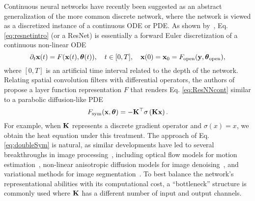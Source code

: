 \documentclass[reqno]{amsart}
\newcommand{\bfx}{ {\bf x}}
\newcommand{\bfy}{ {\bf y}}
\newcommand{\bfK}{{\bf K}}
\newcommand{\bftheta}{{\boldsymbol{\theta}}}
\begin{document}
Continuous neural networks have recently been suggested as an abstract generalization of the more common discrete network, where the network is viewed as a discretized instance of a continuous ODE or PDE. As shown by~\cite{ChaudhariEtAl2017,E2017,HaberRuthotto2017,chen2018neural}, Eq. \eqref{eq:resnetintro} (or a ResNet) is essentially a forward Euler discretization of a continuous non-linear ODE
\begin{equation}
\label{eq:ResNNcont}
    \partial_t \bfx(t) = F(\bfx(t), \bftheta(t)), \quad t \in [0,T], \quad \bfx(0) = \bfx_0 = F_{\mathrm{open}}(\bfy,\bftheta_{\mathrm{open}}),
\end{equation}
where  $[0,T]$ is an artificial time interval related to the depth of the network. Relating spatial convolution filters with differential operators, the authors of~\cite{ruthotto2019deep} propose a layer function representation $F$ that renders Eq. \eqref{eq:ResNNcont} similar to a parabolic diffusion-like PDE
\begin{equation}
\label{eq:doubleSym}
    F_{\rm sym}(\bfx,\bftheta) = - \bfK^\top \sigma \left(\bfK \bfx\right).
\end{equation}
For example, when $\bfK$ represents a discrete gradient operator and $\sigma(x)=x$, we obtain the heat equation under this treatment. The approach of Eq. \eqref{eq:doubleSym} is natural, as similar developments have led to several breakthroughs in image processing~\cite{weickert1998anisotropic}, including optical flow models for motion estimation~\cite{HornSchunck1981}, non-linear anisotropic diffusion models for image denoising~\cite{PeronaMalik1990,RudinOsherFatemi1992}, and variational methods for image segmentation~\cite{AmbrosioTortorelli1990,ChanVese1999}. 
To best balance the network's representational abilities with its computational cost, a ``bottleneck'' structure is commonly used where $\bfK$ has a different number of input and output channels.
\end{document}
